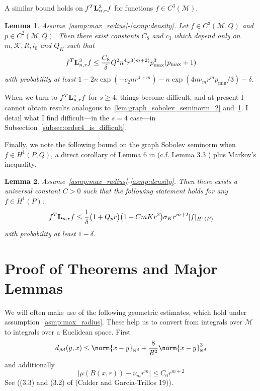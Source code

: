 \documentclass{article}
\newcommand{\Reals}{\mathbb{R}}
\newcommand{\abs}[1]{\left \lvert #1 \right \rvert}
\newcommand{\1}{\mathbf{1}}
\newcommand{\Rd}{\Reals^d}
\newcommand{\Lap}{{\bf L}}
\newcommand{\mc}[1]{\mathcal{#1}}
\theoremstyle{alden}
\theoremstyle{aldenthm}
\newtheorem{lemma}{Lemma}
\theoremstyle{definition}
\theoremstyle{remark}
\begin{document}
A similar bound holds on $f^T \Lap_{n,r}^3 f$ for functions $f \in C^3(\mc{M})$.
\begin{lemma}
	\label{lem:graph_sobolev_seminorm_3}
	Assume~\ref{asmp:max_radius}-\ref{asmp:density}. Let $f \in C^3(\mc{M},Q)$ and $p \in C^2(\mc{M},Q)$. Then there exist constants $C_8$ and $c_3$ which depend only on $m,\mc{K},R,i_0$ and $Q_K$ such that
	\begin{equation}
	\label{eqn:graph_sobolev_seminorm_3}
	f^T \Lap_{n,r}^3 f \leq \frac{C_8}{\delta} Q^2 n^4 r^{3(m + 2)} p_{\max}^3 (p_{\max} + 1)
	\end{equation}
	with probability at least $1 - 2n\exp(-c_2nr^{4 + m}) - n\exp(4 n\nu_mr^mp_{\min}/3) - \delta$. 
\end{lemma}

When we turn to $f^T \Lap_{n,r}^s f$ for $s \geq 4$, things become difficult, and at present I cannot obtain results analogous to~\ref{lem:graph_sobolev_seminorm_2} and~\ref{lem:graph_sobolev_seminorm_3}. I detail what I find difficult---in the $s = 4$ case---in Subsection~\ref{subsec:order4_is_difficult}.

Finally, we note the following bound on the graph Sobolev seminorm when $f \in H^1(P,Q)$, a direct corollary of Lemma 6 in \citep{trillos2019} (c.f. Lemma 3.3 \citep{burago2014}) plus Markov's inequality.

\begin{lemma}
	Assume~\ref{asmp:max_radius}-\ref{asmp:density}. Then there exists a universal constant $C > 0$ such that the following statement holds for any $f \in H^1(P)$:
	\begin{equation*}
	f^T \Lap_{n,r} f \leq \frac{1}{\delta}\bigl(1 + Q_p r\bigr) \bigl(1 + CmKr^2\bigr) \sigma_K r^{m + 2} |f|_{H^1(P)}
	\end{equation*}
	with probability at least $1 - \delta$. 
\end{lemma}




\section{Proof of Theorems and Major Lemmas}
We will often make use of the following geometric estimates, which hold under assumption~\ref{asmp:max_radius}. These help us to convert from integrals over $\mc{M}$ to integrals over a Euclidean space. First
\begin{equation}
\label{eqn:geodisic_euclidean_distance}
d_{\mc{M}}(y,x) \leq \norm{x - y}_{\Rd} + \frac{8}{R^2} \norm{x - y}_{\Rd}^3
\end{equation} 
and additionally
\begin{equation}
\label{eqn:manifold_ball_volume}
\abs{\mu(B(x,r)) - \nu_m r^m} \leq C_0r^{m + 2}
\end{equation}
See ((3.3) and (3.2) of (Calder and Garcia-Trillos 19)).
\end{document}
